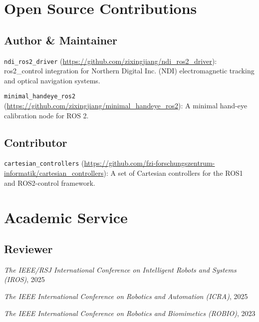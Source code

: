 \documentclass[11pt,letterpaper]{report}
\newcommand{\listitemspace}{0.25em}
\renewenvironment{itemize}
{\begin{list}{}{\setlength{\leftmargin}{0em}
			\setlength{\parskip}{0em}
			\setlength{\itemsep}{\listitemspace}
			\setlength{\parsep}{\listitemspace}}}
	{\end{list}}
\begin{document}
\section*{Open Source Contributions}
\subsection*{Author \& Maintainer}
\begin{itemize}
	\item \texttt{ndi\_ros2\_driver} (\href{https://github.com/zixingjiang/ndi_ros2_driver}{https://github.com/zixingjiang/ndi\_ros2\_driver}): ros2\_control integration for Northern Digital Inc. (NDI) electromagnetic tracking and optical navigation systems.
	
	\item \texttt{minimal\_handeye\_ros2} (\href{https://github.com/zixingjiang/minimal_handeye_ros2}{https://github.com/zixingjiang/minimal\_handeye\_ros2}): A minimal hand-eye calibration node for ROS 2.
\end{itemize}
\subsection*{Contributor}
\begin{itemize}
	\item \texttt{cartesian\_controllers} (\href{https://github.com/fzi-forschungszentrum-informatik/cartesian_controllers}{https://github.com/fzi-forschungszentrum-informatik/cartesian\_controllers}): A set of Cartesian controllers for the ROS1 and ROS2-control framework.
\end{itemize}
	
\section*{Academic Service}
\subsection*{Reviewer}
\begin{itemize}
	\item \textit{The IEEE/RSJ International Conference	on Intelligent Robots and Systems (IROS)}, 2025
	\item \textit{The IEEE International Conference on Robotics and Automation (ICRA)}, 2025
	\item \textit{The IEEE International Conference on Robotics and Biomimetics (ROBIO)}, 2023 
\end{itemize}
	
\end{document}
